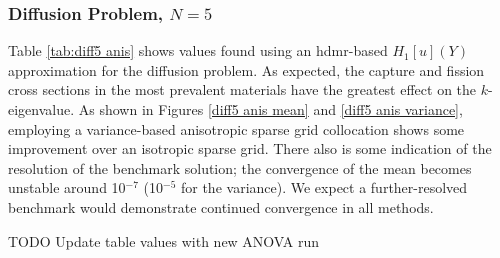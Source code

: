 \documentclass[11pt]{article}
\begin{document}
\subsubsection{Diffusion Problem, $N=5$}
Table \ref{tab:diff5 anis} shows values found using an hdmr-based $H_1[u](Y)$ approximation for the diffusion problem.  As expected, the capture and fission cross sections in the most prevalent materials have the greatest effect on the $k$-eigenvalue.
As shown in Figures \ref{diff5 anis mean} and \ref{diff5 anis variance}, employing a variance-based anisotropic sparse grid collocation shows some improvement over an isotropic sparse grid.  There also is some indication of the resolution of the benchmark solution; the convergence of the mean becomes unstable around 10$^{-7}$ (10$^{-5}$ for the variance).  We expect a further-resolved benchmark would demonstrate continued convergence in all methods.

TODO Update table values with new ANOVA run
\end{document}
